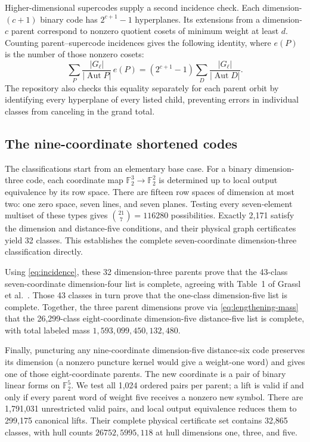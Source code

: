 \documentclass[11pt]{article}
\theoremstyle{definition}
\theoremstyle{remark}
\newcommand{\F}{\mathbb F_2}
\newcommand{\Aut}{\operatorname{Aut}}
\begin{document}
Higher-dimensional supercodes supply a second incidence check. Each
dimension-\((c+1)\) binary code has \(2^{c+1}-1\) hyperplanes. Its
extensions from a dimension-\(c\) parent correspond to nonzero quotient
cosets of minimum weight at least \(d\). Counting parent--supercode
incidences gives the following identity, where \(e(P)\) is the number of
those nonzero cosets:
\begin{equation}\label{eq:incidence}
 \sum_P\frac{|G_\ell|}{|\Aut P|}\,e(P)
 =(2^{c+1}-1)\sum_D\frac{|G_\ell|}{|\Aut D|}.
\end{equation}
The repository also checks this equality separately for each parent
orbit by identifying every hyperplane of every listed child, preventing
errors in individual classes from canceling in the grand total.

\subsection{The nine-coordinate shortened codes}\label{sec:nine-site}

The classifications start from an elementary base case. For a binary
dimension-three code, each coordinate map \(\F^3\to\F^2\) is determined
up to local output equivalence by its row space. There are fifteen row
spaces of dimension at most two: one zero space, seven lines, and seven
planes. Testing every seven-element multiset of these types gives
\(\binom{21}{7}=116280\) possibilities. Exactly 2,171 satisfy the
dimension and distance-five conditions, and their physical graph
certificates yield 32 classes. This establishes the complete
seven-coordinate dimension-three classification directly.

Using \eqref{eq:incidence}, these 32 dimension-three parents prove that
the 43-class seven-coordinate dimension-four list is complete, agreeing
with Table~1 of Grassl et al.\ \cite{dodeca}. Those 43 classes in turn
prove that the one-class dimension-five list is complete. Together, the
three parent dimensions prove via \eqref{eq:lengthening-mass} that the
26,299-class eight-coordinate dimension-five distance-five list is
complete, with total labeled mass \(1{,}593{,}099{,}450{,}132{,}480\).

Finally, puncturing any nine-coordinate dimension-five distance-six code
preserves its dimension (a nonzero puncture kernel would give a
weight-one word) and gives one of those eight-coordinate parents. The
new coordinate is a pair of binary linear forms on \(\F^5\). We test all
1,024 ordered pairs per parent; a lift is valid if and only if every
parent word of weight five receives a nonzero new symbol. There are
1,791,031 unrestricted valid pairs, and local output equivalence reduces
them to 299,175 canonical lifts. Their complete physical certificate set
contains 32,865 classes, with hull counts \(26752,5995,118\) at hull
dimensions one, three, and five.
\end{document}
